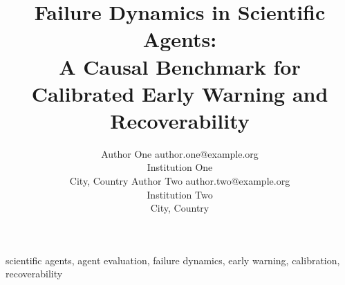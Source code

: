 \documentclass[twoside,11pt]{article}
\begin{document}
\title{Failure Dynamics in Scientific Agents:\\
A Causal Benchmark for Calibrated Early Warning and Recoverability}

\author{\name Author One \email author.one@example.org \\
       \addr Institution One\\
       City, Country
       \AND
       \name Author Two \email author.two@example.org \\
       \addr Institution Two\\
       City, Country}


\maketitle

\begin{abstract}%

\end{abstract}

\begin{keywords}
scientific agents, agent evaluation, failure dynamics, early warning,
calibration, recoverability
\end{keywords}








\impact{}


\vskip 0.2in


\appendix

\end{document}
